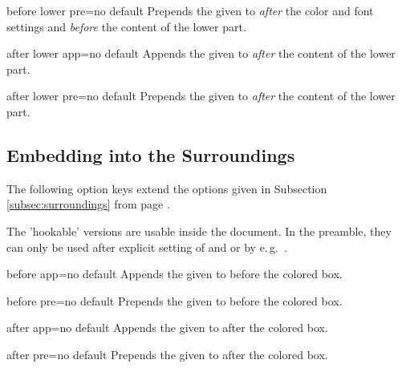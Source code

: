 \begin{docTcbKey}{before lower pre}{=}{no default}
  Prepends the given  to  \emph{after} the color and font settings
  and \emph{before} the content of the lower part.
\end{docTcbKey}

\begin{docTcbKey}{after lower app}{=}{no default}
  Appends the given  to  \emph{after} the content of the lower part.
\end{docTcbKey}

\begin{docTcbKey}{after lower pre}{=}{no default}
  Prepends the given  to  \emph{after} the content of the lower part.
\end{docTcbKey}


\subsection{Embedding into the Surroundings}
The following option keys extend the options given in Subsection \ref{subsec:surroundings}
from page \pageref{subsec:surroundings}.

\begin{marker}
The 'hookable' versions are usable inside the document.
In the preamble, they can only be used after explicit setting of
 and  or by e.\,g.\ .
\end{marker}

\begin{docTcbKey}{before app}{=}{no default}
  Appends the given  to  before the colored box.
\end{docTcbKey}

\begin{docTcbKey}{before pre}{=}{no default}
  Prepends the given  to  before the colored box.
\end{docTcbKey}

\begin{docTcbKey}{after app}{=}{no default}
  Appends the given  to  after the colored box.
\end{docTcbKey}

\begin{docTcbKey}{after pre}{=}{no default}
  Prepends the given  to  after the colored box.
\end{docTcbKey}

